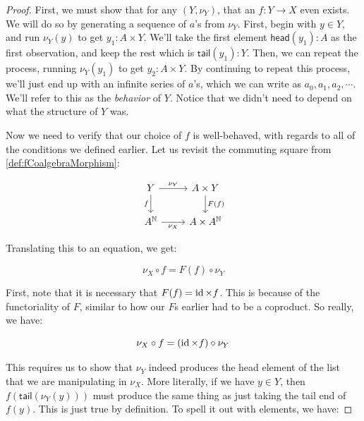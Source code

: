 \begin{proof}
    
  First, we must show that for any $(Y, \nu_Y)$, that an $f : Y \rightarrow X$ even exists.
We will do so by generating a sequence of $a$'s from $\nu_Y$.
First, begin with $y \in Y$, and run $\nu_Y (y)$ to get $y_1 : A \times Y$.
We'll take the first element $\mathsf{head}(y_1) : A$ as the first observation, and keep the rest which is $\mathsf{tail}(y_1) : Y$.
Then, we can repeat the process, running $\nu_Y (y_1)$ to get $y_2 : A \times Y$.
By continuing to repeat this process, we'll just end up with an infinite series of $a$'s, which we can write as $a_0, a_1, a_2, \cdots$.
We'll refer to this as the \emph{behavior} of $Y$.
Notice that we didn't need to depend on what the structure of $Y$ was.

Now we need to verify that our choice of $f$ is well-behaved, with regards to all of the conditions we defined earlier.
Let us revisit the commuting square from \cref{def:fCoalgebraMorphism}:

    \[\begin{tikzcd}
        Y & {A \times Y} \\
        {A^\mathbb{N}} & {A \times A^\mathbb{N}}
        \arrow["{\nu_Y}", from=1-1, to=1-2]
        \arrow["f"', from=1-1, to=2-1]
        \arrow["{F(f)}", from=1-2, to=2-2]
        \arrow["{\nu_X}"', from=2-1, to=2-2]
    \end{tikzcd}\]

Translating this to an equation, we get:

\begin{equation}
    \nu_X \circ f = F(f) \circ \nu_Y
\end{equation} 

First, note that it is necessary that $F(f) = \operatorname{id} \times f$.
This is because of the functoriality of $F$, similar to how our $F$s earlier had to be a coproduct.
So really, we have:

\begin{equation}
    \nu_X \circ f = (\operatorname{id} \times f) \circ \nu_Y
\end{equation}

This requires us to show that $\nu_Y$ indeed produces the head element of the list that we are manipulating in $\nu_X$.
More literally, if we have $y \in Y$, then $f(\mathsf{tail}(\nu_Y (y)))$ must produce the same thing as just taking the tail end of $f(y)$.
This is just true by definition.
To spell it out with elements, we have:


\end{proof}
